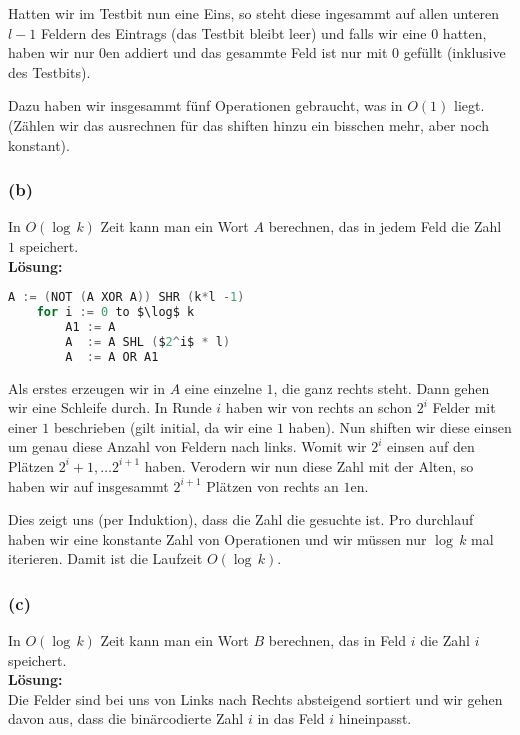 \documentclass[11pt,a4paper,ngerman]{article}
\begin{document}
Hatten wir im Testbit nun eine Eins, so steht diese ingesammt auf allen unteren $l-1$ Feldern des Eintrags (das Testbit bleibt leer) und
falls wir eine $0$ hatten, haben wir nur $0$en addiert und das gesammte Feld ist nur mit $0$ gefüllt (inklusive des Testbits).

Dazu haben wir insgesammt fünf Operationen gebraucht, was in $O(1)$ liegt. (Zählen wir das ausrechnen für das shiften hinzu ein bisschen mehr, aber noch konstant).

\subsubsection*{(b)}
In $O(\log \, k)$ Zeit kann man ein Wort $A$ berechnen, das in jedem Feld die Zahl $1$ speichert.\\

\noindent\textbf{Lösung:}\\

\begin{lstlisting}[frame=single, language=C,morekeywords={:=,SHR,SHL,NOT,XOR,AND,OR,MUL}]
	A := (NOT (A XOR A)) SHR (k*l -1)
	for i := 0 to $\log$ k
		A1 := A
		A  := A SHL ($2^i$ * l)
		A  := A OR A1
\end{lstlisting}

Als erstes erzeugen wir in $A$ eine einzelne $1$, die ganz rechts steht. Dann gehen wir eine Schleife durch. In Runde $i$ haben
wir von rechts an schon $2^i$ Felder mit einer $1$ beschrieben (gilt initial, da wir eine $1$ haben). Nun shiften wir diese einsen
um genau diese Anzahl von Feldern nach links. Womit wir $2^i$ einsen auf den Plätzen $2^i+1, \ldots 2^{i+1}$ haben. 
Verodern wir nun diese Zahl mit der Alten, so haben wir auf insgesammt $2^{i+1}$ Plätzen von rechts an $1$en.

Dies zeigt uns (per Induktion), dass die Zahl die gesuchte ist. Pro durchlauf haben wir eine konstante Zahl von Operationen und
wir müssen nur $\log \, k$ mal iterieren. Damit ist die Laufzeit $O(\log \, k)$.

\subsubsection*{(c)}
In $O(\log \, k)$ Zeit kann man ein Wort $B$ berechnen, das in Feld $i$ die Zahl $i$ speichert.\\

\noindent\textbf{Lösung:}\\

Die Felder sind bei uns von Links nach Rechts absteigend sortiert und wir gehen davon aus,
dass die binärcodierte Zahl $i$ in das Feld $i$ hineinpasst.
\end{document}

